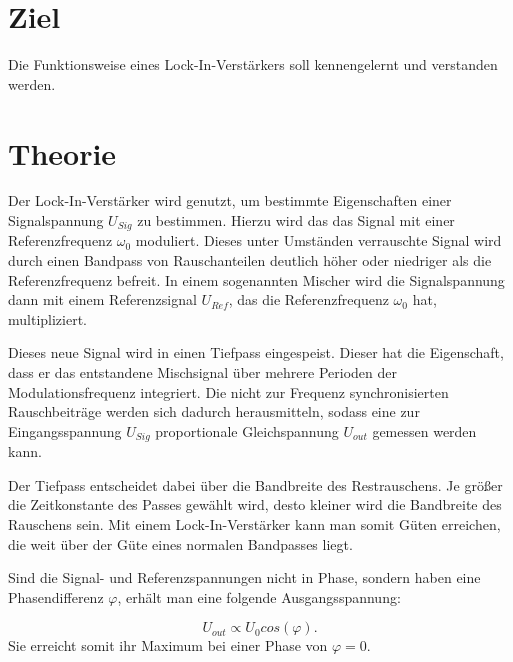 \section{Ziel}
\label{sec:Ziel}

Die Funktionsweise eines Lock-In-Verstärkers soll kennengelernt und verstanden werden. 

\section{Theorie}
\label{sec:Theorie}

Der Lock-In-Verstärker wird genutzt, um bestimmte Eigenschaften einer Signalspannung 
$U_{Sig}$ zu bestimmen. 
Hierzu wird das das Signal mit einer Referenzfrequenz $\omega_0$ moduliert.
Dieses unter Umständen verrauschte Signal wird durch einen Bandpass von Rauschanteilen 
deutlich höher oder niedriger als die Referenzfrequenz befreit. %
In einem sogenannten Mischer wird die Signalspannung dann mit einem Referenzsignal 
$U_{Ref}$, das die Referenzfrequenz $\omega_0$ hat, multipliziert. 

\noindent Dieses neue Signal wird in einen Tiefpass eingespeist. Dieser hat die 
Eigenschaft, dass er das entstandene Mischsignal über mehrere Perioden der 
Modulationsfrequenz integriert.
Die nicht zur Frequenz synchronisierten Rauschbeiträge werden sich dadurch 
herausmitteln, sodass eine zur Eingangsspannung $U_{Sig}$ proportionale Gleichspannung 
$U_{out}$ gemessen werden kann. 

\noindent Der Tiefpass entscheidet dabei über die Bandbreite des Restrauschens. 
Je größer die Zeitkonstante des Passes gewählt wird, desto kleiner wird die Bandbreite 
des Rauschens sein. Mit einem Lock-In-Verstärker kann man somit Güten erreichen, 
die weit über der Güte eines normalen Bandpasses liegt. %

Sind die Signal- und Referenzspannungen nicht in Phase, sondern haben eine 
Phasendifferenz $\varphi$, erhält man eine folgende Ausgangsspannung: 

\begin{equation}
    U_{out} \propto U_0 cos(\varphi).
\end{equation}
Sie erreicht somit ihr Maximum bei einer Phase von $\varphi = 0$. 
